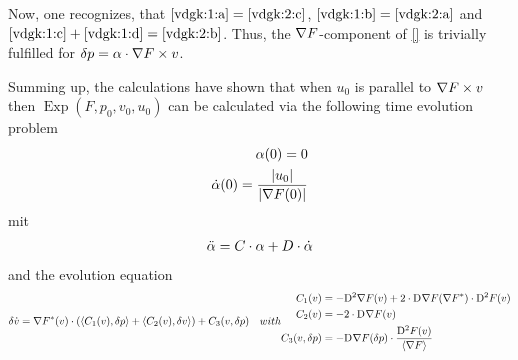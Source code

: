 Now, one recognizes, that $ \eqref{vdgk:1:a}  =  \eqref{vdgk:2:c} $,
$ \eqref{vdgk:1:b}  =  \eqref{vdgk:2:a} $ and
$ \eqref{vdgk:1:c} + \eqref{vdgk:1:d}  =  \eqref{vdgk:2:b} $.
Thus, the $ \nabla F $-component of \eqref{}
is trivially fulfilled for $ \delta p  =  \alpha \cdot \nabla F \times v $.



Summing up, the calculations have shown
that when $ u_0 $ is parallel to $ \nabla F \times v $
then $ \operatorname{Exp}( F, p_0, v_0, u_0 ) $ can be calculated
via the following time evolution problem
\begin{align}
    \alpha( 0 )  =  0  \\
    \dot{ \alpha }( 0 )  =  \frac{ \lvert  u_0  \rvert }{ \lvert  \nabla F( 0 )  \rvert }
\end{align}
mit
\begin{align}
    \ddot{ \alpha }   =
    C \cdot \alpha  +  D \cdot \dot{ \alpha }
\end{align}
and the evolution equation
\begin{subequations}
    \begin{align}
        \delta \dot{ v }   &=
        \darg{F}( v ) \mult
        (   \skap{ C_1( v ) }{ \delta p }  + 
            \skap{ C_2( v ) }{ \delta v }     )  +
        C_3( v, \delta p )
    \end{align}
    with
    \begin{align}
        C_1( v )  &=
        -\diff{2}{\grad{F}}( v )  +
        2 \mult \diff{}{\grad{F}}( \darg{F} ) \mult \diff{2}{F}( v )  \\
        C_2( v )  &=
        -2 \mult \diff{}{\grad{F}}( v )  \\
        C_3( v, \delta p )  &=
        - \diff{}{\grad{F}}( \delta p ) \mult \frac{ \diff{2}{F}(v ) }{ \skaq{ \grad{F} } }
    \end{align}
\end{subequations}